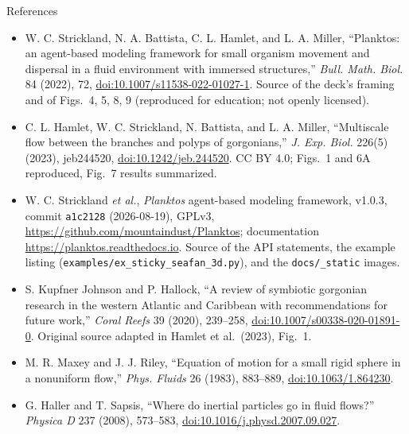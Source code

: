 \documentclass[aspectratio=169,11pt]{beamer}
\newcommand{\code}[1]{\texttt{#1}}
\begin{document}
\begin{frame}{References}
\footnotesize
\begin{itemize}\itemsep3pt
  \item W. C. Strickland, N. A. Battista, C. L. Hamlet, and L. A. Miller, ``Planktos: an agent-based modeling framework for small organism movement and dispersal in a fluid environment with immersed structures,'' \emph{Bull. Math. Biol.} 84 (2022), 72, \href{https://doi.org/10.1007/s11538-022-01027-1}{doi:10.1007/s11538-022-01027-1}. Source of the deck's framing and of Figs.~4, 5, 8, 9 (reproduced for education; not openly licensed).
  \item C. L. Hamlet, W. C. Strickland, N. Battista, and L. A. Miller, ``Multiscale flow between the branches and polyps of gorgonians,'' \emph{J. Exp. Biol.} 226(5) (2023), jeb244520, \href{https://doi.org/10.1242/jeb.244520}{doi:10.1242/jeb.244520}. CC BY 4.0; Figs.~1 and 6A reproduced, Fig.~7 results summarized.
  \item W. C. Strickland \emph{et al.}, \emph{Planktos} agent-based modeling framework, v1.0.3, commit \code{a1c2128} (2026-08-19), GPLv3, \url{https://github.com/mountaindust/Planktos}; documentation \url{https://planktos.readthedocs.io}. Source of the API statements, the example listing (\code{examples/ex\_sticky\_seafan\_3d.py}), and the \code{docs/\_static} images.
  \item S. Kupfner Johnson and P. Hallock, ``A review of symbiotic gorgonian research in the western Atlantic and Caribbean with recommendations for future work,'' \emph{Coral Reefs} 39 (2020), 239--258, \href{https://doi.org/10.1007/s00338-020-01891-0}{doi:10.1007/s00338-020-01891-0}. Original source adapted in Hamlet et al.\ (2023), Fig.~1.
  \item M. R. Maxey and J. J. Riley, ``Equation of motion for a small rigid sphere in a nonuniform flow,'' \emph{Phys. Fluids} 26 (1983), 883--889, \href{https://doi.org/10.1063/1.864230}{doi:10.1063/1.864230}.
  \item G. Haller and T. Sapsis, ``Where do inertial particles go in fluid flows?'' \emph{Physica D} 237 (2008), 573--583, \href{https://doi.org/10.1016/j.physd.2007.09.027}{doi:10.1016/j.physd.2007.09.027}.
\end{itemize}
\end{frame}
\end{document}
